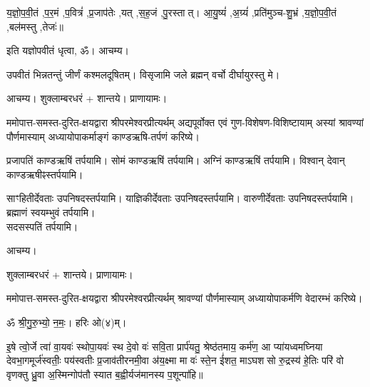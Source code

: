 
य॒ज्ञो॒प॒वी॒तं \sep प॒र॒मं \sep प॒वित्रं॑ \sep प्र॒जाप॑तेः \sep यत् \sep स॒ह॒जं \sep पु॒रस्तात्। आ॒यु॒ष्यं॑ \sep अ॒ग्र्यं॑ \sep प्रति॑मुञ्च-शु॒भ्रं \sep य॒ज्ञो॒प॒वी॒तं \sep बल॑मस्तु \sep तेजः॑॥

इति यज्ञोपवीतं धृत्वा, ॐ। आचम्य।

उपवीतं भिन्नतन्तुं जीर्णं कश्मलदूषितम्। विसृजामि जले ब्रह्मन् वर्चो दीर्घायुरस्तु मे।



आचम्य। शुक्लाम्बरधरं + शान्तये। प्राणायामः।

ममोपात्त-समस्त-दुरित-क्षयद्वारा श्रीपरमेश्वरप्रीत्यर्थम्
अद्य\-पूर्वोक्त एवं गुण-विशेषण-विशिष्टायाम्
अस्यां श्रावण्यां पौर्णमास्याम् अध्यायोपाकर्माङ्गं काण्डऋषि-तर्पणं करिष्ये।


प्रजापतिं काण्डऋषिं तर्पयामि। 
सोमं काण्डऋषिं तर्पयामि। 
अग्निं काण्डऋषिं तर्पयामि। 
विश्वान् देवान् काण्डऋषीꣴ\-स्तर्पयामि।

साꣳहितीर्देवताः उपनिषद\-स्तर्पयामि। 
याज्ञिकीर्देवताः उपनिषद\-स्तर्पयामि। 
वारुणीर्देवताः उपनिषद\-स्तर्पयामि। 
ब्रह्माणं स्वयम्भुवं तर्पयामि। %
\\
सदसस्पतिं तर्पयामि।

आचम्य।




शुक्लाम्बरधरं + शान्तये। प्राणायामः।

ममोपात्त-समस्त-दुरित-क्षयद्वारा श्रीपरमेश्वरप्रीत्यर्थम्
श्रावण्यां पौर्णमास्याम् अध्यायोपाकर्मणि वेदारम्भं करिष्ये।


ॐ श्री॒गु॒रु॒भ्यो॒ न॒मः॒। हरिः ओ(४)म्।

इ॒षे त्वो॒र्जे त्वा॑ वा॒यवः॑ स्थोपा॒यवः॑ स्थ दे॒वो वः॑ सवि॒ता प्रार्प॑यतु॒ श्रेष्ठ॑तमाय॒ कर्म॑ण॒ आ
प्या॑यध्वमघ्निया देवभा॒गमूर्ज॑स्वतीः॒ पय॑स्वतीः प्र॒जाव॑तीरनमी॒वा अ॑य॒क्ष्मा मा वः॑ स्ते॒न ई॑शत॒
माऽघशसो रु॒द्रस्य॑ हे॒तिः परि॑ वो वृणक्तु ध्रु॒वा अ॒स्मिन्गोप॑तौ स्यात ब॒ह्वीर्यज॑मानस्य
प॒शून्पा॑हि॥ %

